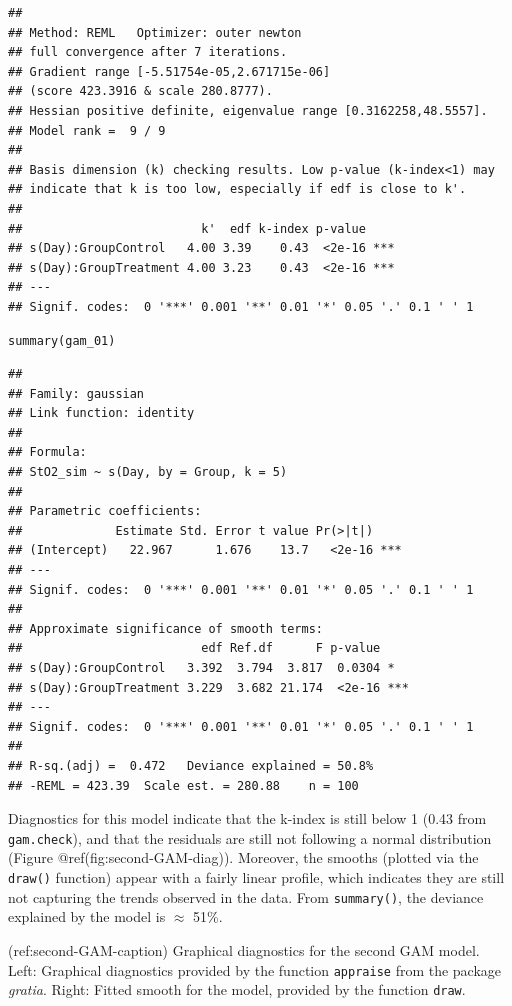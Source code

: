 \documentclass[Royal,times,sagev]{sagej}
\begin{document}
\begin{verbatim}
## 
## Method: REML   Optimizer: outer newton
## full convergence after 7 iterations.
## Gradient range [-5.51754e-05,2.671715e-06]
## (score 423.3916 & scale 280.8777).
## Hessian positive definite, eigenvalue range [0.3162258,48.5557].
## Model rank =  9 / 9 
## 
## Basis dimension (k) checking results. Low p-value (k-index<1) may
## indicate that k is too low, especially if edf is close to k'.
## 
##                         k'  edf k-index p-value    
## s(Day):GroupControl   4.00 3.39    0.43  <2e-16 ***
## s(Day):GroupTreatment 4.00 3.23    0.43  <2e-16 ***
## ---
## Signif. codes:  0 '***' 0.001 '**' 0.01 '*' 0.05 '.' 0.1 ' ' 1
\end{verbatim}

\begin{verbatim}
summary(gam_01)
\end{verbatim}

\begin{verbatim}
## 
## Family: gaussian 
## Link function: identity 
## 
## Formula:
## StO2_sim ~ s(Day, by = Group, k = 5)
## 
## Parametric coefficients:
##             Estimate Std. Error t value Pr(>|t|)    
## (Intercept)   22.967      1.676    13.7   <2e-16 ***
## ---
## Signif. codes:  0 '***' 0.001 '**' 0.01 '*' 0.05 '.' 0.1 ' ' 1
## 
## Approximate significance of smooth terms:
##                         edf Ref.df      F p-value    
## s(Day):GroupControl   3.392  3.794  3.817  0.0304 *  
## s(Day):GroupTreatment 3.229  3.682 21.174  <2e-16 ***
## ---
## Signif. codes:  0 '***' 0.001 '**' 0.01 '*' 0.05 '.' 0.1 ' ' 1
## 
## R-sq.(adj) =  0.472   Deviance explained = 50.8%
## -REML = 423.39  Scale est. = 280.88    n = 100
\end{verbatim}

Diagnostics for this model indicate that the k-index is still below 1
(0.43 from \texttt{gam.check}), and that the residuals are still not
following a normal distribution (Figure @ref(fig:second-GAM-diag)).
Moreover, the smooths (plotted via the \texttt{draw()} function) appear
with a fairly linear profile, which indicates they are still not
capturing the trends observed in the data. From \texttt{summary()}, the
deviance explained by the model is \(\approx\) 51\%.

(ref:second-GAM-caption) Graphical diagnostics for the second GAM model.
Left: Graphical diagnostics provided by the function \texttt{appraise}
from the package \emph{gratia}. Right: Fitted smooth for the model,
provided by the function \texttt{draw}.
\end{document}

